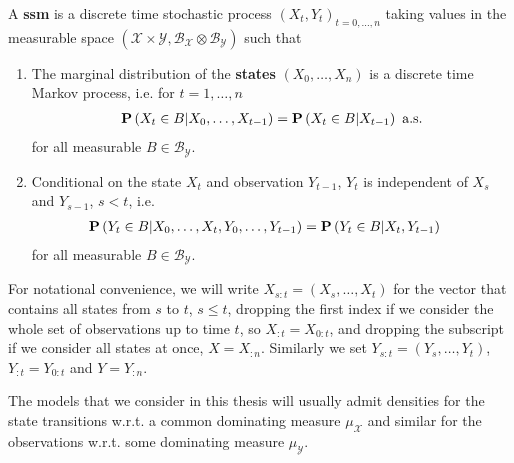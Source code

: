 \begin{definition}
    \label{def:ssm}
    A \textbf{\gls{ssm}} is a discrete time stochastic process $(X_t, Y_t)_{t=0, \dots, n}$ taking values in the measurable space $\left(\mathcal X \times \mathcal Y, \mathcal B_{\mathcal X} \otimes \mathcal B_{\mathcal Y}\right)$ such that
    \begin{enumerate}
        \item The marginal distribution of the \textbf{states} $(X_0, \dots, X_{n})$ is a discrete time Markov process, i.e. for $t = 1, \dots, n$
              \begin{align}
                  \label{eq:markov_property}
                  \P \left( X_{t} \in B \middle| X_0, \dots, X_{t - 1} \right) = \P \left( X_{t} \in B \middle| X_{t - 1} \right) \text{ a.s.}
              \end{align}
              for all measurable $B \in \mathcal B_{\mathcal Y}$.
        \item Conditional on the state $X_t$ and observation $Y_{t - 1}$, $Y_t$ is independent of $X_s$ and $Y_{s - 1}$, $s < t$, i.e.
              \begin{align*}
                  \P \left( Y_{t} \in B \middle| X_{0}, \dots, X_{t}, Y_{0}, \dots, Y_{t - 1} \right) & = \P \left( Y_{t} \in B | X_{t}, Y_{t - 1} \right)
              \end{align*}
              for all measurable $B \in \mathcal B _{\mathcal Y}$.
    \end{enumerate}
\end{definition}

For notational convenience, we will write $X_{s:t} = \left(X_s, \dots, X_{t}\right)$ for the vector that contains all states from $s$ to $t$, $s \leq t$, dropping the first index if we consider the whole set of observations up to time $t$, so $X_{:t} = X_{0:t}$, and dropping the subscript if we consider all states at once, $X = X_{:n}$.
Similarly we set $Y_{s:t} = \left(Y_s, \dots, Y_{t}\right)$, $Y_{:t} = Y_{0:t}$ and $Y = Y_{:n}$.


The models that we consider in this thesis will usually admit densities for the state transitions w.r.t. a common dominating measure $\mu_{\mathcal X}$ and similar for the observations w.r.t. some dominating measure $\mu_{\mathcal Y}$. 

